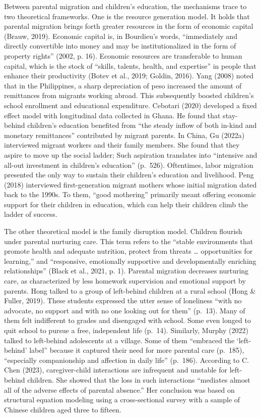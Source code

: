 \documentclass[
  man,floatsintext]{apa7}
\begin{document}
Between parental migration and children's education, the mechanisms trace to two theoretical frameworks. One is the resource generation model. It holds that parental migration brings forth greater resources in the form of economic capital (Brauw, 2019). Economic capital is, in Bourdieu's words, ``immediately and directly convertible into money and may be institutionalized in the form of property rights'' (2002, p. 16). Economic resources are transferable to human capital, which is the stock of ``skills, talents, health, and expertise'' in people that enhance their productivity (Botev et al., 2019; Goldin, 2016). Yang (2008) noted that in the Philippines, a sharp depreciation of peso increased the amount of remittances from migrants working abroad. This subsequently boosted children's school enrollment and educational expenditure. Cebotari (2020) developed a fixed effect model with longitudinal data collected in Ghana. He found that stay-behind children's education benefited from ``the steady inflow of both in-kind and monetary remittances'' contributed by migrant parents. In China, Gu (2022a) interviewed migrant workers and their family members. She found that they aspire to move up the social ladder; Such aspiration translates into ``intensive and all-out investment in children's education'' (p.~526). Oftentimes, labor migration presented the only way to sustain their children's education and livelihood. Peng (2018) interviewed first-generation migrant mothers whose initial migration dated back to the 1990s. To them, ``good mothering'' primarily meant offering economic support for their children in education, which can help their children climb the ladder of success.

The other theoretical model is the family disruption model. Children flourish under parental nurturing care. This term refers to the ``stable environments that promote health and adequate nutrition, protect from threats \ldots{} opportunities for learning,'' and ``responsive, emotionally supportive and developmentally enriching relationships'' (Black et al., 2021, p. 1). Parental migration decreases nurturing care, as characterized by less homework supervision and emotional support by parents. Hong talked to a group of left-behind children at a rural school (Hong \& Fuller, 2019). These students expressed the utter sense of loneliness ``with no advocate, no support and with no one looking out for them'' (p.~13). Many of them felt indifferent to grades and disengaged with school. Some even longed to quit school to pursue a free, independent life (p.~14). Similarly, Murphy (2022) talked to left-behind adolescents at a village. Some of them ``embraced the `left-behind' label'' because it captured their need for more parental care (p.~185), ``especially companionship and affection in daily life'' (p.~186). According to C. Chen (2023), caregiver-child interactions are infrequent and unstable for left-behind children. She showed that the loss in such interactions ``mediates almost all of the adverse effects of parental absence.'' Her conclusion was based on structural equation modeling using a cross-sectional survey with a sample of Chinese children aged three to fifteen.
\end{document}
